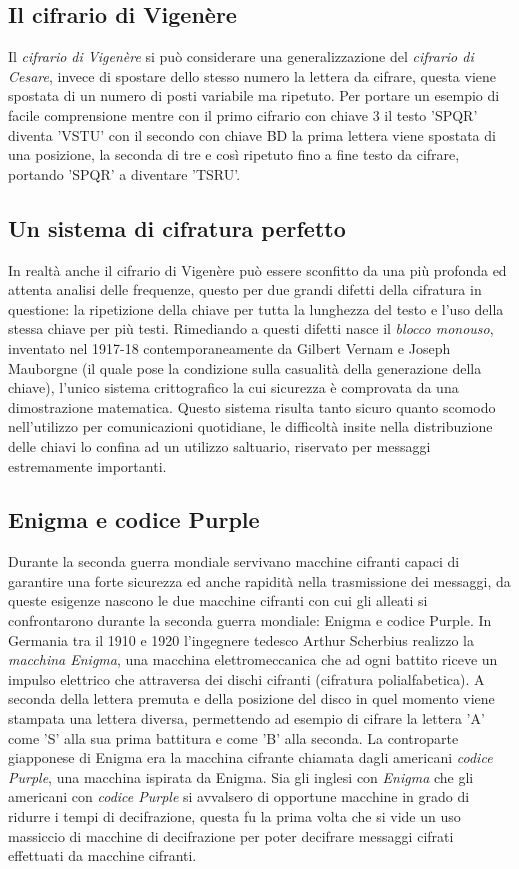 \documentclass[a4paper, 12pt]{article}
\begin{document}
\subsection{Il cifrario di Vigenère}
Il \textit{cifrario di Vigenère} si può considerare una generalizzazione del \textit{cifrario di Cesare}, invece di spostare dello stesso numero la lettera da cifrare, questa viene spostata di un numero di posti variabile ma ripetuto. Per portare un esempio di facile comprensione mentre con il primo cifrario con chiave 3 il testo 'SPQR' diventa 'VSTU' con il secondo con chiave BD la prima lettera viene spostata di una posizione, la seconda di tre e così ripetuto fino a fine testo da cifrare, portando 'SPQR' a diventare 'TSRU'.
\subsection{Un sistema di cifratura perfetto}
In realtà anche il cifrario di Vigenère può essere sconfitto da una più profonda ed attenta analisi delle frequenze, questo per due grandi difetti della cifratura in questione: la ripetizione della chiave per tutta la lunghezza del testo e l'uso della stessa chiave per più testi.\newline
Rimediando a questi difetti nasce il \textit{blocco monouso}, inventato nel 1917-18 contemporaneamente da Gilbert Vernam e Joseph Mauborgne (il quale pose la condizione sulla casualità della generazione della chiave), l'unico sistema crittografico la cui sicurezza è comprovata da una dimostrazione matematica. Questo sistema risulta tanto sicuro quanto scomodo nell'utilizzo per comunicazioni quotidiane, le difficoltà insite nella distribuzione delle chiavi lo confina ad un utilizzo saltuario, riservato per messaggi estremamente importanti.
\subsection{Enigma e codice Purple}
Durante la seconda guerra mondiale servivano macchine cifranti capaci di garantire una forte sicurezza ed anche rapidità nella trasmissione dei messaggi, da queste esigenze nascono le due macchine cifranti con cui gli alleati si confrontarono durante la seconda guerra mondiale: Enigma e codice Purple.\newline
In Germania tra il 1910 e 1920 l'ingegnere tedesco Arthur Scherbius realizzo la \textit{macchina Enigma}, una macchina elettromeccanica che ad ogni battito riceve un impulso elettrico che attraversa dei dischi cifranti (cifratura polialfabetica). A seconda della lettera premuta e della posizione del disco in quel momento viene stampata una lettera diversa, permettendo ad esempio di cifrare la lettera 'A' come 'S' alla sua prima battitura e come 'B' alla seconda.
La controparte giapponese di Enigma era la macchina cifrante chiamata dagli americani \textit{codice Purple}, una macchina ispirata da Enigma.\newline
Sia gli inglesi con \textit{Enigma} che gli americani con \textit{codice Purple} si avvalsero di opportune macchine in grado di ridurre i tempi di decifrazione, questa fu la prima volta che si vide un uso massiccio di macchine di decifrazione per poter decifrare messaggi cifrati effettuati da macchine cifranti.
\end{document}
